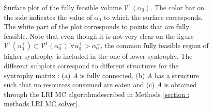 \documentclass[12pt, titlepage]{report}
\begin{document}
\begin{figure}[h!]
\caption[caption for LOF]{Surface plot of the fully feasible volume $\mathcal{V}^1(\alpha_0)$. The color bar on the side indicates the value of $\alpha_0$ to which the surface corresponds. The white part of the plot corresponds to points that  are fully feasible. Note that even though it is not very clear on the figure $\mathcal{V}^1(\alpha_0^+) \subset \mathcal{V}^1(\alpha_0^-) \ \forall \alpha_0^+ > \alpha_0^-$, \ie the common fully feasible region of higher syntrophy is included in the one of lower syntrophy. The different subplots correspond to different structures for the syntrophy matrix : (a) $A$ is fully connected, (b) $A$ has a structure such that no resources consumed are eaten and (c) $A$ is obtained through the LRI MC algorithm\footnotemark described in Methods \ref{section : methods LRI MC solver}.} \label{fig : results feasibility cfv variation with syntrophy}
\end{figure}
\end{document}
